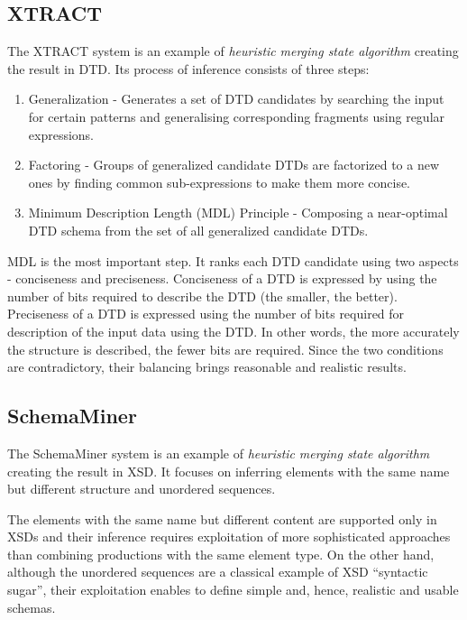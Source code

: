 \subsection{XTRACT}
The XTRACT  system is an example of \emph{heuristic} \emph{merging state algorithm} creating the result in DTD. Its process of inference consists of three steps:
\begin{enumerate}
\item Generalization - Generates a set of DTD candidates by searching the input for certain patterns and generalising corresponding fragments using regular expressions.
\item Factoring - Groups of generalized candidate DTDs are factorized to a new ones by finding common sub-expressions to make them more concise.
\item Minimum Description Length (MDL) Principle - Composing a near-optimal DTD schema from the set of all generalized candidate DTDs.
\end{enumerate}

MDL is the most important step. It ranks each DTD candidate using two aspects - conciseness and preciseness. Conciseness of a DTD is expressed by using the number of bits required to describe the DTD (the smaller, the better). Preciseness of a DTD is expressed using the number of bits required for description of the input data using the DTD. In other words, the more accurately the structure is described, the fewer bits are required. Since the two conditions are contradictory, their balancing brings reasonable and realistic results.

\subsection{SchemaMiner}
The SchemaMiner system  is an example of \emph{heuristic} \emph{merging state algorithm} creating the result in XSD. It focuses on inferring elements with the same name but different structure and unordered sequences.

The elements with the same name but different content are supported only in XSDs and their inference requires exploitation of more sophisticated approaches than combining productions with the same element
type. On the other hand, although the unordered sequences are a classical example of XSD “syntactic sugar”, their exploitation enables to define simple and, hence, realistic and usable schemas.


